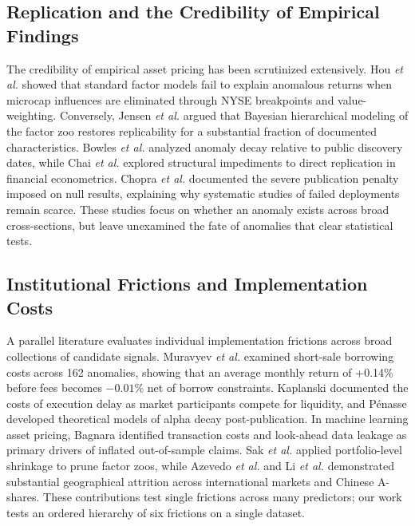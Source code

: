 \documentclass{ieeeaccess}
\begin{document}
\subsection{Replication and the Credibility of Empirical Findings}
The credibility of empirical asset pricing has been scrutinized extensively. Hou \textit{et al.} \cite{hou2020replicating} showed that standard factor models fail to explain anomalous returns when microcap influences are eliminated through NYSE breakpoints and value-weighting. Conversely, Jensen \textit{et al.} \cite{jensen2023there} argued that Bayesian hierarchical modeling of the factor zoo restores replicability for a substantial fraction of documented characteristics. Bowles \textit{et al.} \cite{bowles2024anomaly} analyzed anomaly decay relative to public discovery dates, while Chai \textit{et al.} \cite{chai2026understanding} explored structural impediments to direct replication in financial econometrics. Chopra \textit{et al.} \cite{chopra2023null} documented the severe publication penalty imposed on null results, explaining why systematic studies of failed deployments remain scarce. These studies focus on whether an anomaly exists across broad cross-sections, but leave unexamined the fate of anomalies that clear statistical tests.

\subsection{Institutional Frictions and Implementation Costs}
A parallel literature evaluates individual implementation frictions across broad collections of candidate signals. Muravyev \textit{et al.} \cite{muravyev2025anomalies} examined short-sale borrowing costs across 162 anomalies, showing that an average monthly return of +0.14\% before fees becomes $-0.01$\% net of borrow constraints. Kaplanski \cite{kaplanski2023race} documented the costs of execution delay as market participants compete for liquidity, and P{\'e}nasse \cite{penasse2022understanding} developed theoretical models of alpha decay post-publication. In machine learning asset pricing, Bagnara \cite{bagnara2024asset} identified transaction costs and look-ahead data leakage as primary drivers of inflated out-of-sample claims. Sak \textit{et al.} \cite{sak2024exploring} applied portfolio-level shrinkage to prune factor zoos, while Azevedo \textit{et al.} \cite{azevedo2023stock} and Li \textit{et al.} \cite{li2024replicating} demonstrated substantial geographical attrition across international markets and Chinese A-shares. These contributions test single frictions across many predictors; our work tests an ordered hierarchy of six frictions on a single dataset.
\end{document}
